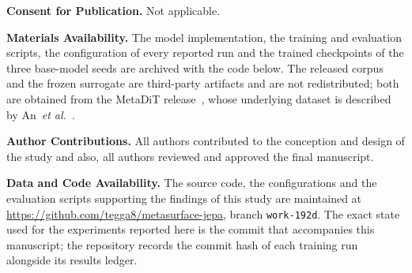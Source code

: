 \documentclass[pdflatex,oneside,sn-mathphys-num]{sn-jnl}
\theoremstyle{thmstyleone}
\theoremstyle{thmstyletwo}
\theoremstyle{thmstylethree}
\begin{document}
\vspace{0.3em}
\noindent\textbf{Consent for Publication.} Not applicable.

\vspace{0.3em}
\noindent\textbf{Materials Availability.} The model implementation, the training and
evaluation scripts, the configuration of every reported run and the trained checkpoints of the
three base-model seeds are archived with the code below. The released corpus and the frozen
surrogate are third-party artifacts and are not redistributed; both are obtained from the
MetaDiT release~\cite{metadit}, whose underlying dataset is described by An~\emph{et
al.}~\cite{an2020}.

\vspace{0.3em}
\noindent\textbf{Author Contributions.} All authors contributed to the conception and design of the study and also, all authors reviewed and approved the final manuscript.

\vspace{0.3em}
\noindent\textbf{Data and Code Availability.} The source code, the configurations and the
evaluation scripts supporting the findings of this study are maintained at
\url{https://github.com/tegga8/metasurface-jepa}, branch \texttt{work-192d}. The exact state
used for the experiments reported here is the commit that accompanies this manuscript; the
repository records the commit hash of each training run alongside its results ledger.
\end{document}
